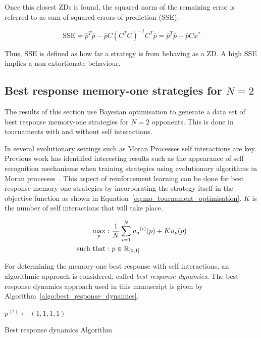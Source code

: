 Once this closest ZDs is found, the squared norm of the remaining error is
referred to as sum of squared errors of prediction (SSE):

\begin{equation}\label{eqn:x_SSError_formula}
    \text{SSE} = {\bar{p}} ^ T \bar{p} -
           \bar{p} C \left(C ^ T C \right) ^ {-1} C ^ T \bar{p}
         = {\bar{p}} ^ T \bar{p} - \bar{p} C x ^ *
\end{equation}

Thus, SSE is defined as how far a strategy is from behaving as a ZD. A
high SSE implies a non extortionate behaviour.

\subsection{Best response memory-one strategies for \(N=2\)}\label{subsection:best_response_n_2}

The results of this section use Bayesian optimisation to generate a data set of
best response memory-one strategies for \(N=2\) opponents. This is done in
tournaments with and without self interactions.

In several evolutionary settings such as Moran Processes self interactions are
key. Previous work has identified interesting results such as the appearance of
self recognition mechanisms when training strategies using evolutionary
algorithms in Moran processes~\cite{Knight2018}. This aspect of reinforcement
learning can be done for best response memory-one strategies by incorporating
the strategy itself in the objective function as shown in
Equation~\ref{eq:mo_tournament_optimisation}. \(K\) is the number of self
interactions that will take place.

\begin{equation}\label{eq:mo_evolutionary_optimisation}
    \begin{aligned}
    \max_p: & \ \frac{1}{N} \sum\limits_{i=1} ^ {N} {u_q}^{(i)} (p) + Ku_p(p)
    \\
    \text{such that}: & \ p \in \mathbb{R}_{[0, 1]}
    \end{aligned}
   \end{equation}

For determining the memory-one best response with self interactions, an
algorithmic approach is considered, called \textit{best response dynamics}. The
best response dynamics approach used in this manuscript is given by
Algorithm~\ref{algo:best_response_dynamics}.

\begin{algorithm}[H]
    $p^{(t)}\leftarrow (1, 1, 1, 1)$\;
    \caption{Best response dynamics Algorithm}
    \label{algo:best_response_dynamics}
 \end{algorithm}

